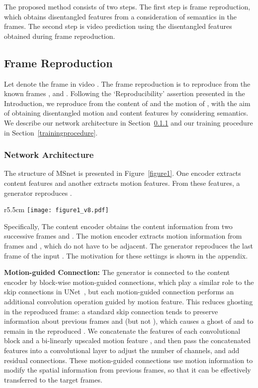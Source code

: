 


The proposed method consists of two steps. The first step is frame reproduction, which obtains disentangled features from a consideration of semantics in the frames. The second step is video prediction using the disentangled features obtained during frame reproduction.



\vspace*{-10pt}
\subsection{Frame Reproduction} 
\label{featureextractors}
Let  denote the  frame in video . The frame reproduction is to reproduce  from the known frames , and . Following the `Reproducibility' assertion presented in the Introduction, we reproduce  from the content of  and the motion of , with the aim of obtaining disentangled motion and content features by considering semantics. We describe our network architecture in Section~\ref{networkarchi} and our training procedure in Section~\ref{trainingprocedure}.
\vspace*{-10pt}
\subsubsection{Network Architecture}\label{networkarchi}
The structure of MSnet is presented in Figure~\ref{figure1}. One encoder extracts content features and another extracts motion features. From these features, a generator reproduces . 
\begin{wrapfigure}{r}{5.5cm}
  \centering
\texttt{[image: figure1\_v8.pdf]}
  
  \caption{\label{figure1} Architecture of MSnet, showing multi-scale motion-guided connections.}
\end{wrapfigure}
Specifically, The content encoder  obtains the content information  from two successive frames  and . The motion encoder  extracts motion information  from frames  and , which do not have to be adjacent. The generator  reproduces the last frame of the input . The motivation for these settings is shown in the appendix.




\textbf{Motion-guided Connection: }The generator  is connected to the content encoder  by block-wise motion-guided connections, which play a similar role to the skip connections in UNet~\cite{ronneberger2015u}, but each motion-guided connection performs an additional convolution operation guided by motion feature. This reduces ghosting in the reproduced frame: a standard skip connection tends to preserve information about previous frames  and  (but not ), which causes a ghost of  and  to remain in the reproduced . We concatenate the features of each convolutional block and a bi-linearly upscaled motion feature , and then pass the concatenated features into a  convolutional layer to adjust the number of channels, and add residual connections. These motion-guided connections use motion information to modify the spatial information from previous frames, so that it can be effectively transferred to the target frames.



